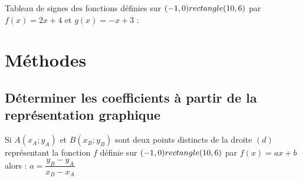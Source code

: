 \vspace{0.5cm}
\begin{Exemple}
Tableau de signes des fonctions définies sur $(-1,0) rectangle (10,6)$ par $f(x)=2x+4$ et $g(x)=-x+3$ :\\

\vspace{6cm}

\end{Exemple}   

\newpage
\section{Méthodes}

\subsection{Déterminer les coefficients à partir de la représentation graphique}

\begin{Propriété}
Si $A(x_A ; y_A)$ et $ B(x_B ; y_B)$ sont deux points distincts de la droite $(d)$ représentant la
fonction $f$ définie sur $(-1,0) rectangle (10,6)$ par $f(x)=ax+b$ alors : $a=\dfrac{y_B-y_A}{x_B-x_A}$
\end{Propriété}




